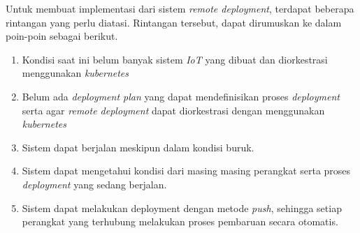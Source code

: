 Untuk membuat implementasi dari sistem \textit{remote deployment}, terdapat beberapa rintangan yang perlu diatasi. Rintangan tersebut, dapat dirumuskan ke dalam poin-poin sebagai berikut.

\begin{enumerate}
  \item Kondisi saat ini belum banyak sistem \textit{IoT} yang dibuat dan diorkestrasi menggunakan \textit{kubernetes}
  \item Belum ada \textit{deployment plan} yang dapat mendefinisikan proses \textit{deployment} serta agar \textit{remote deployment} dapat diorkestrasi  dengan menggunakan \textit{kubernetes}
  \item Sistem dapat berjalan meskipun dalam kondisi buruk.
  \item Sistem dapat mengetahui kondisi dari masing masing perangkat serta proses \textit{deployment} yang sedang berjalan.
  \item Sistem dapat melakukan deployment dengan metode \textit{push}, sehingga setiap perangkat yang terhubung melakukan proses pembaruan secara otomatis.
\end{enumerate}
